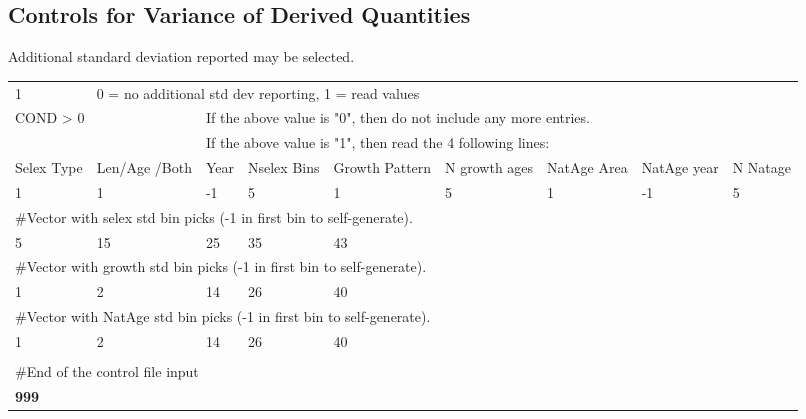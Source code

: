 \subsection{Controls for Variance of Derived Quantities}
Additional standard deviation reported may be selected.
\begin{center}
	\begin{longtable}{p{1cm} p{1.3cm} p{1.2cm} p{1.2cm} p{1.2cm} p{1.2cm} p{1.4cm} p{1.4cm} p{1.4cm}}
		\hline
		1 & \multicolumn{8}{l}{0 = no additional std dev reporting, 1 = read values}\\
		\multicolumn{2}{l}{COND > 0} & \multicolumn{7}{l}{If the above value is "0", then do not include any more entries.}\\
		  & & \multicolumn{7}{l}{If the above value is "1", then read the 4 following lines:}\\
		\hline
		Selex Type & Len/Age /Both & Year & Nselex Bins & Growth Pattern & N growth ages & NatAge Area & NatAge year  & N Natage\\
		\hline
		1 & 1 & -1 & 5 & 1 & 5 & 1 & -1 & 5\\ 
		\multicolumn{9}{l}{\#Vector with selex std bin picks (-1 in first bin to self-generate).} \\
		5 & 15 & 25 & 35 & 43 & & & & \\
		\multicolumn{9}{l}{\#Vector with growth std bin picks (-1 in first bin to self-generate).} \\	
		1 & 2 & 14 & 26 & 40 & & & & \\	
		\multicolumn{9}{l}{\#Vector with NatAge std bin picks (-1 in first bin to self-generate).} \\	
		1 & 2 & 14 & 26 & 40 & & & & \\
		\hline
		\multicolumn{9}{l}{}\\
		\multicolumn{9}{l}{\#End of the control file input}\\
		\bfseries{999} & \multicolumn{8}{l}{} \\
		\hline			
	\end{longtable}
\end{center}


